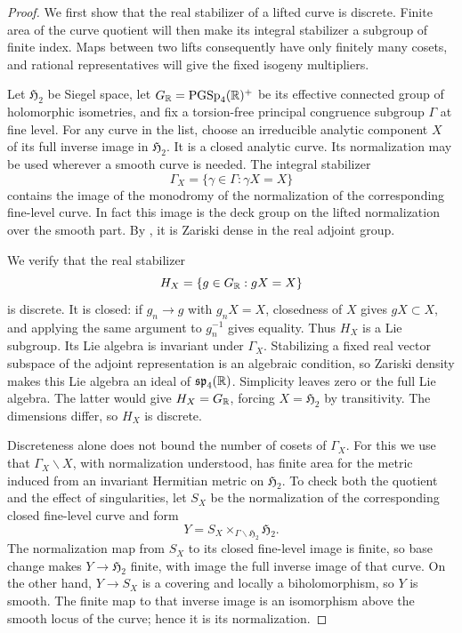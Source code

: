 \begin{proof}
We first show that the real stabilizer of a lifted curve is discrete.
Finite area of the curve quotient will then make its integral stabilizer
a subgroup of finite index.  Maps between two lifts consequently have
only finitely many cosets, and rational representatives will give the
fixed isogeny multipliers.

Let $\mathfrak H_2$ be Siegel space, let
$G_{\mathbb R}=\operatorname{PGSp}_4(\mathbb R)^+$ be its effective connected group of
holomorphic isometries, and fix a torsion-free principal congruence
subgroup $\Gamma$ at fine level.  For any curve in the list, choose an
irreducible analytic component $X$ of its full inverse image in
$\mathfrak H_2$.  It is a closed analytic curve.  Its normalization
may be used wherever a smooth curve is needed.  The integral stabilizer
\[
 \Gamma_X=\{\gamma\in\Gamma:\gamma X=X\}
\]
contains the image of the monodromy of the normalization of the
corresponding fine-level curve.  In fact this image is the deck group
on the lifted normalization over the smooth part.  By
, it is Zariski dense in the real adjoint group.

We verify that the real stabilizer
\[
 H_X=\{g\in G_{\mathbb R}:gX=X\}
\]
is discrete.  It is closed: if $g_n\to g$ with $g_nX=X$, closedness of
$X$ gives $gX\subset X$, and applying the same argument to $g_n^{-1}$
gives equality.  Thus $H_X$ is a Lie subgroup.  Its Lie algebra is
invariant under $\Gamma_X$.  Stabilizing a fixed real vector subspace
of the adjoint representation is an algebraic condition, so Zariski
density makes this Lie algebra an ideal of
$\mathfrak{sp}_4(\mathbb R)$.  Simplicity leaves zero or the full Lie algebra.
The latter would give $H_X=G_{\mathbb R}$, forcing $X=\mathfrak H_2$ by
transitivity.  The dimensions differ, so $H_X$ is discrete.

Discreteness alone does not bound the number of cosets of $\Gamma_X$.
For this we use that $\Gamma_X\backslash X$, with normalization understood,
has finite area for the metric induced from an invariant Hermitian
metric on $\mathfrak H_2$.  To check both the quotient and the effect
of singularities, let $S_X$ be the normalization of the corresponding
closed fine-level curve and form
\[
 Y=S_X\mathbin{\times}_{\Gamma\backslash\mathfrak H_2}\mathfrak H_2.
\]
The normalization map from $S_X$ to its closed fine-level image is
finite, so base change makes $Y\to\mathfrak H_2$ finite, with image
the full inverse image of that curve.  On the other hand,
$Y\to S_X$ is a covering and locally a biholomorphism, so $Y$ is
smooth.  The finite map to that inverse image is an isomorphism above
the smooth locus of the curve; hence it is its normalization.


\end{proof}
